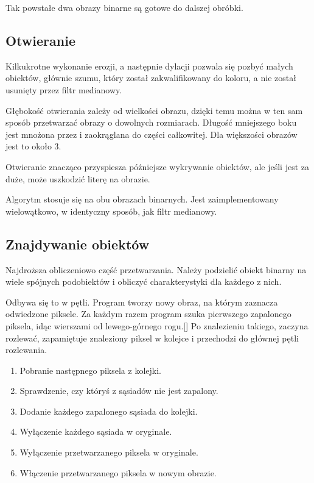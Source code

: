 \documentclass[a4paper,12pt]{article}
\begin{document}
			Tak powstałe dwa obrazy binarne są gotowe do dalszej obróbki.
			
		\subsection{Otwieranie}
			Kilkukrotne wykonanie erozji, a następnie dylacji pozwala się pozbyć małych obiektów, głównie szumu, który został zakwalifikowany do koloru, a nie został usunięty przez filtr medianowy.
			
			Głębokość otwierania zależy od wielkości obrazu, dzięki temu można w ten sam sposób przetwarzać obrazy o dowolnych rozmiarach.
			Długość mniejszego boku jest mnożona przez \openingdepth{} i zaokrąglana do części całkowitej.
			Dla większości obrazów jest to około 3.
			
			Otwieranie znacząco przyspiesza późniejsze wykrywanie obiektów, ale jeśli jest za duże, może uszkodzić literę na obrazie.
			
			Algorytm stosuje się na obu obrazach binarnych.
			Jest zaimplementowany wielowątkowo, w identyczny sposób, jak filtr medianowy.
			
		\subsection{Znajdywanie obiektów}
			Najdroższa obliczeniowo część przetwarzania.
			Należy podzielić obiekt binarny na wiele spójnych podobiektów i obliczyć charakterystyki dla każdego z nich.
			
			Odbywa się to w pętli.
			Program tworzy nowy obraz, na którym zaznacza odwiedzone piksele.
			Za każdym razem program szuka pierwszego zapalonego piksela, idąc wierszami od lewego-górnego rogu.[]
			Po znalezieniu takiego, zaczyna rozlewać, zapamiętuje znaleziony piksel w kolejce i przechodzi do głównej pętli rozlewania.
			\begin{enumerate}
				\item Pobranie następnego piksela z kolejki.
				\item Sprawdzenie, czy któryś z sąsiadów nie jest zapalony.
				\item Dodanie każdego zapalonego sąsiada do kolejki.
				\item Wyłączenie każdego sąsiada w oryginale.
				\item Wyłączenie przetwarzanego piksela w oryginale.
				\item Włączenie przetwarzanego piksela w nowym obrazie.
			\end{enumerate}
\end{document}
